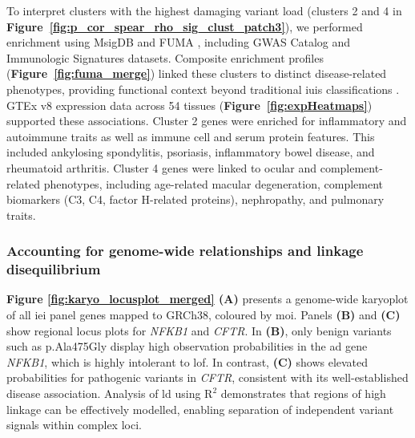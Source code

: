 To interpret clusters with the highest damaging variant load (clusters 2 and 4 in \textbf{Figure~\ref{fig:p_cor_spear_rho_sig_clust_patch3}}), we performed enrichment using MsigDB and FUMA \cite{watanabe_functional_2017}, including GWAS Catalog and Immunologic Signatures datasets.  Composite enrichment profiles (\textbf{Figure~\ref{fig:fuma_merge}}) linked these clusters to distinct disease-related phenotypes, providing functional context beyond traditional \ac{iuis} classifications \cite{poli_human_2025}.  GTEx v8 expression data across 54 tissues (\textbf{Figure~\ref{fig:expHeatmaps}}) supported these associations.   Cluster 2 genes were enriched for inflammatory and autoimmune traits as well as immune cell and serum protein features.  This included ankylosing spondylitis, psoriasis, inflammatory bowel disease, and rheumatoid arthritis. Cluster 4 genes were linked to ocular and complement-related phenotypes, including age-related macular degeneration, complement biomarkers (C3, C4, factor H-related proteins), nephropathy, and pulmonary traits.



\subsubsection*{Accounting for genome-wide relationships and linkage disequilibrium}

\textbf{Figure \ref{fig:karyo_locusplot_merged} (A)} presents a genome-wide karyoplot of all \ac{iei} panel genes mapped to GRCh38, coloured by \ac{moi}. 
Panels \textbf{(B)} and \textbf{(C)} show regional locus plots for \textit{NFKB1} and \textit{CFTR}. 
In \textbf{(B)}, only benign variants such as p.Ala475Gly display high observation probabilities in the \ac{ad} gene \textit{NFKB1}, which is highly intolerant to \ac{lof}. 
In contrast, \textbf{(C)} shows elevated probabilities for pathogenic variants in \textit{CFTR}, consistent with its well-established disease association. 
Analysis of \ac{ld} using $\text{R}^2$ demonstrates that regions of high linkage can be effectively modelled, enabling separation of independent variant signals within complex loci.

